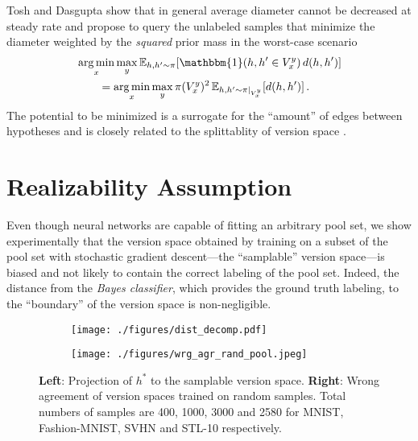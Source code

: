 \documentclass[runningheads, envcountsame, a4paper]{llncs}
\newcommand{\argmin}{\operatornamewithlimits{arg\,min}}
\begin{document}
Tosh and Dasgupta \cite{Tosh17} show that in general average diameter cannot be decreased at steady rate and propose to query the unlabeled samples that minimize the diameter weighted by the \textit{squared} prior mass in the worst-case scenario
\begin{align}
    \MoveEqLeft \argmin_x \max_y \mathbb{E}_{h,h^\prime \sim \pi}\! \left[ \mathbbm{1}(h, h^\prime \in V_x^y) \, d(h, h^\prime) \right] \\
    &= \argmin_x \max_y \pi(V_x^y)^2\, \mathbb{E}_{h,h^\prime \sim \pi|_{V_x^y}}\! \left[ d(h, h^\prime) \right].
\end{align}
The potential to be minimized is a surrogate for the ``amount'' of edges between hypotheses and is closely related to the splittablity of version space \cite{Tosh17,Dasgupta06}. 


\section{Realizability Assumption}
\label{sec:realizability_assumption}

Even though neural networks are capable of fitting an arbitrary pool set, we show experimentally that the version space obtained by training on a subset of the pool set with stochastic gradient descent---the ``samplable'' version space---is biased and not likely to contain the correct labeling of the pool set. Indeed, the distance from the \textit{Bayes classifier}, which provides the ground truth labeling, to the ``boundary'' of the version space is non-negligible.

\begin{figure}[t!]
\begin{subfigure}{0.45\textwidth}
    \center
    \texttt{[image: ./figures/dist\_decomp.pdf]}
\end{subfigure}\begin{subfigure}{0.55\textwidth}
    \centering
    \texttt{[image: ./figures/wrg\_agr\_rand\_pool.jpeg]}
\end{subfigure}
\caption{\textbf{Left}: Projection of $h^*$ to the samplable version space. \textbf{Right}: Wrong agreement of version spaces trained on random samples. Total numbers of samples are 400, 1000, 3000 and 2580 for MNIST, Fashion-MNIST, SVHN and STL-10 respectively.}
\label{fig:dist_decomp_wrg_agr}
\end{figure}
\end{document}
